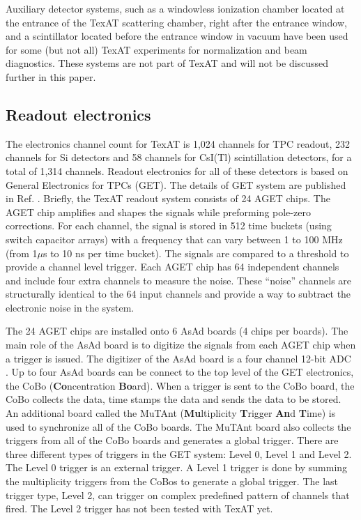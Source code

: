 \documentclass[final,number,sort&compress,5p,times,twocolumn]{elsarticle}
\begin{document}
Auxiliary detector systems, such as a windowless ionization chamber located at the entrance of the TexAT scattering chamber, right after the entrance window, and a scintillator located before the entrance window in vacuum have been used for some (but not all) TexAT experiments for normalization and beam diagnostics. These systems are not part of TexAT and will not be discussed further in this paper.

\subsection{Readout electronics \label{GET}}

The electronics channel count for TexAT is 1,024 channels for TPC readout, 232 channels for Si detectors and 58 channels for CsI(Tl) scintillation detectors, for a total of 1,314 channels. Readout electronics for all of these detectors is based on General Electronics for TPCs (GET). The details of GET system are published in Ref.  \cite{Pollacco}. Briefly, the TexAT readout system consists of 24 AGET chips. The AGET chip amplifies and shapes the signals while preforming pole-zero corrections. For each channel, the signal is stored in 512 time buckets (using switch capacitor arrays) with a frequency that can vary between 1 to 100 MHz (from 1$\mu$s to 10 ns per time bucket). The signals are compared to a threshold to provide a channel level trigger. Each AGET chip has 64 independent channels and include four extra channels to measure the noise. These ``noise'' channels are structurally identical to the 64 input channels and provide a way to subtract the electronic noise in the system.

The 24 AGET chips are installed onto 6 AsAd boards (4 chips per boards). The main role of the AsAd board is to digitize the signals from each AGET chip when a trigger is issued. The digitizer of the AsAd board is a four channel 12-bit ADC \cite{Pollacco}. Up to four AsAd boards can be connect to the top level of the GET electronics, the CoBo (\textbf{Co}ncentration \textbf{Bo}ard). When a trigger is sent to the CoBo board, the CoBo collects the data, time stamps the data and sends the data to be stored. An additional board called the MuTAnt (\textbf{Mu}ltiplicity \textbf{T}rigger \textbf{An}d \textbf{T}ime) is used to synchronize all of the CoBo boards. The MuTAnt board also collects the triggers from all of the CoBo boards and generates a global trigger. There are three different types of triggers in the GET system: Level 0, Level 1 and Level 2. The Level 0 trigger is an external trigger. A Level 1 trigger is done by summing the multiplicity triggers from the CoBos to generate a global trigger. The last trigger type, Level 2, can trigger on complex predefined pattern of channels that fired. The Level 2 trigger has not been tested with TexAT yet.
\end{document}
